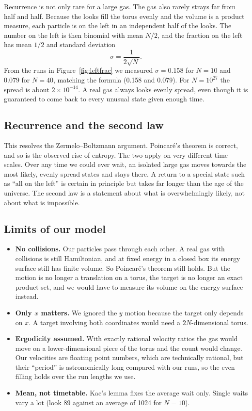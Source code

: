 \documentclass[11pt,a4paper]{article}
\theoremstyle{definition}
\begin{document}
Recurrence is not only rare for a large gas. The gas also rarely strays far from half and half. Because the looks fill the torus evenly and the volume is a product measure, each particle is on the left in an independent half of the looks. The number on the left is then binomial with mean $N/2$, and the fraction on the left has mean $1/2$ and standard deviation
\[
\sigma = \frac{1}{2\sqrt N} .
\]
From the runs in Figure~\ref{fig:leftfrac} we measured $\sigma = 0.158$ for $N = 10$ and $0.079$ for $N = 40$, matching the formula (0.158 and 0.079). For $N = 10^{27}$ the spread is about $2\times10^{-14}$. A real gas always looks evenly spread, even though it is guaranteed to come back to every unusual state given enough time.

\subsection{Recurrence and the second law}

This resolves the Zermelo--Boltzmann argument. Poincar\'e's theorem is correct, and so is the observed rise of entropy. The two apply on very different time scales. Over any time we could ever wait, an isolated large gas moves towards the most likely, evenly spread states and stays there. A return to a special state such as ``all on the left'' is certain in principle but takes far longer than the age of the universe. The second law is a statement about what is overwhelmingly likely, not about what is impossible.

\subsection{Limits of our model}

\begin{itemize}
  \item \textbf{No collisions.} Our particles pass through each other. A real gas with collisions is still Hamiltonian, and at fixed energy in a closed box its energy surface still has finite volume. So Poincar\'e's theorem still holds. But the motion is no longer a translation on a torus, the target is no longer an exact product set, and we would have to measure its volume on the energy surface instead.
  \item \textbf{Only $x$ matters.} We ignored the $y$ motion because the target only depends on $x$. A target involving both coordinates would need a $2N$-dimensional torus.
  \item \textbf{Ergodicity assumed.} With exactly rational velocity ratios the gas would move on a lower-dimensional piece of the torus and the count would change. Our velocities are floating point numbers, which are technically rational, but their ``period'' is astronomically long compared with our runs, so the even filling holds over the run lengths we use.
  \item \textbf{Mean, not timetable.} Kac's lemma fixes the average wait only. Single waits vary a lot (look 89 against an average of 1024 for $N = 10$).
\end{itemize}
\end{document}
